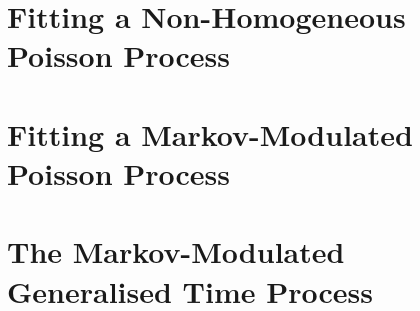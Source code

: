 \section{Fitting a Non-Homogeneous Poisson Process}

\section{Fitting a Markov-Modulated Poisson Process}

\section{The Markov-Modulated Generalised Time Process}